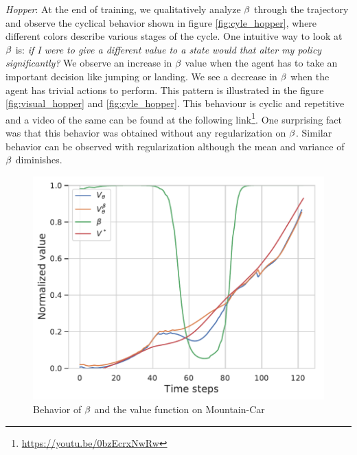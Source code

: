 \emph{Hopper}: At the end of training, we qualitatively analyze $\beta$ through the trajectory and observe the cyclical behavior shown in figure \ref{fig:cyle_hopper}, where different colors describe various stages of the cycle. One intuitive way to look at $\beta$ is: \emph{if I were to give a different value to a state would that alter my policy significantly?} We observe an increase in $\beta$ value when the agent has to take an important decision like jumping or landing. We see a decrease in $\beta$ when the agent has trivial actions to perform. This pattern is illustrated in the figure \ref{fig:visual_hopper} and \ref{fig:cyle_hopper}. This behaviour is cyclic and repetitive and a video of the same can be found at the following link\footnote{\url{https://youtu.be/0bzEcrxNwRw}{}}. One surprising fact was that this behavior was obtained without any regularization on $\beta$. Similar behavior can be observed with regularization although the mean and variance of $\beta$ diminishes.\\
 \begin{figure}[]
     \centering
     \includegraphics[scale=0.45]{fig/mountain.pdf}
     \caption{Behavior of $\beta$ and the value function on Mountain-Car}
     \label{fig:my_label}\label{mountain_car}
 \end{figure}
